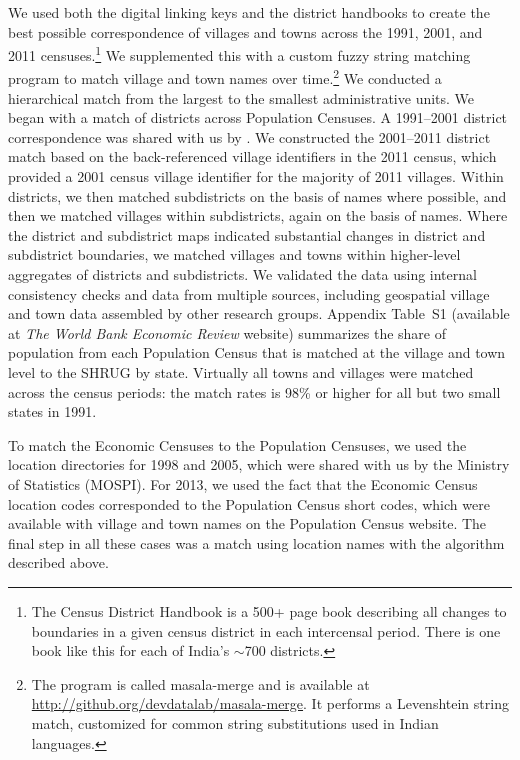 \documentclass[12pt,letterpaper]{article}
\begin{document}
We used both the digital linking keys and the district handbooks to
create the best possible correspondence of villages and towns across
the 1991, 2001, and 2011 censuses.\footnote{The Census District
  Handbook is a 500+ page book describing all changes to boundaries in
  a given census district in each intercensal period. There is one
  book like this for each of India's $\sim$700 districts.} We
supplemented this with a custom fuzzy string matching program to match
village and town names over time.\footnote{The program is called
  masala-merge and is available at
  \href{http://github.com/devdatalab/masala-merge}{http://github.org/devdatalab/masala-merge}. It
  performs a Levenshtein string match, customized for common string
  substitutions used in Indian languages.}  We conducted a hierarchical
match from the largest to the smallest administrative units. We began
with a match of districts across Population Censuses. A 1991--2001
district correspondence was shared with us by
. We constructed the 2001--2011 district match
based on the back-referenced village identifiers in the 2011 census,
which provided a 2001 census village identifier for the majority of
2011 villages. Within districts, we then matched subdistricts on the
basis of names where possible, and then we matched villages within
subdistricts, again on the basis of names. Where the district and
subdistrict maps indicated substantial changes in district and
subdistrict boundaries, we matched villages and towns within
higher-level aggregates of districts and subdistricts.  We validated
the data using internal consistency checks and data from multiple
sources, including geospatial village and town data assembled by other
research groups. Appendix Table~S1
(available at \emph{The World Bank Economic Review} website)
summarizes the share of population from each Population Census that is
matched at the village and town level to the SHRUG by state. Virtually
all towns and villages were matched across the census periods: the
match rates is 98\% or higher for all but two small states in 1991.

To match the Economic Censuses to the Population Censuses, we used the
location directories for 1998 and 2005, which were shared with us by
the Ministry of Statistics (MOSPI).  For 2013, we used the fact that
the Economic Census location codes corresponded to the Population
Census short codes, which were available with village and town names
on the Population Census website. The final step in all these cases
was a match using location names with the algorithm described above.
\end{document}
